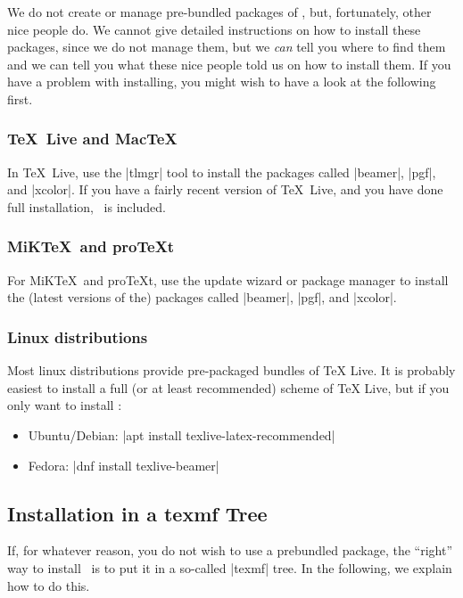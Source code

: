 We do not create or manage pre-bundled packages of \beamer, but, fortunately, other nice people do. We cannot give detailed instructions on how to install these packages, since we do not manage them, but we \emph{can} tell you where to find them and we can tell you what these nice people told us on how to install them. If you have a problem with installing, you might wish to have a look at the following first.


\subsubsection{\TeX\ Live and Mac\TeX}

In \TeX\ Live, use the |tlmgr| tool to install the packages called |beamer|, |pgf|, and |xcolor|. If you have a fairly recent version of \TeX\ Live, and you have done full installation, \beamer\ is included.


\subsubsection{MiK\TeX\ and pro\TeX t}

For MiK\TeX\ and pro\TeX t, use the update wizard or package manager to install the (latest versions of the) packages called |beamer|, |pgf|, and |xcolor|.

\subsubsection{Linux distributions}

Most linux distributions provide pre-packaged bundles of \TeX{} Live. It is probably easiest to install a full (or at least recommended) scheme of \TeX{} Live, but if you only want to install \beamer:

\begin{itemize}
\item
  Ubuntu/Debian: |apt install texlive-latex-recommended|
\item 
  Fedora: |dnf install texlive-beamer|
\end{itemize}

\subsection{Installation in a texmf Tree}

If, for whatever reason, you do not wish to use a prebundled package, the ``right'' way to install \beamer\ is to put it in a so-called |texmf| tree. In the following, we explain how to do this.

